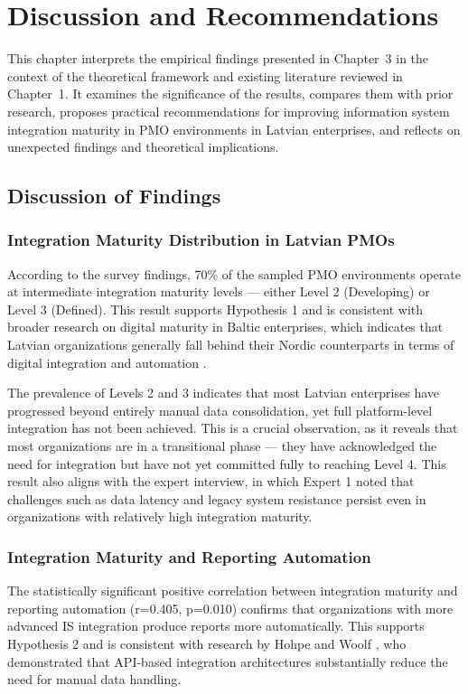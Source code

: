 \chapter{Discussion and Recommendations}
\label{chap:discussion}

This chapter interprets the empirical findings presented in Chapter~3
in the context of the theoretical framework and existing literature
reviewed in Chapter~1. It examines the significance of the results,
compares them with prior research, proposes practical recommendations
for improving information system integration maturity in PMO environments
in Latvian enterprises, and reflects on unexpected findings and
theoretical implications.

\section{Discussion of Findings}
\label{sec:discussion}

\subsection{Integration Maturity Distribution in Latvian PMOs}
According to the survey findings, 70\% of the sampled PMO environments
operate at intermediate integration maturity levels --- either Level 2
(Developing) or Level 3 (Defined). This result supports Hypothesis 1
and is consistent with broader research on digital maturity in Baltic
enterprises, which indicates that Latvian organizations generally fall
behind their Nordic counterparts in terms of digital integration and
automation \cite{eurostat2023}.

The prevalence of Levels 2 and 3 indicates that most Latvian enterprises
have progressed beyond entirely manual data consolidation, yet full
platform-level integration has not been achieved. This is a crucial
observation, as it reveals that most organizations are in a transitional
phase --- they have acknowledged the need for integration but have not yet
committed fully to reaching Level 4. This result also aligns with the
expert interview, in which Expert 1 noted that challenges such as data
latency and legacy system resistance persist even in organizations with
relatively high integration maturity.

\subsection{Integration Maturity and Reporting Automation}
The statistically significant positive correlation between integration
maturity and reporting automation (r=0.405, p=0.010) confirms that
organizations with more advanced IS integration produce reports more
automatically. This supports Hypothesis 2 and is consistent with
research by Hohpe and Woolf \cite{hohpe2004}, who demonstrated that
API-based integration architectures substantially reduce the need for
manual data handling.


